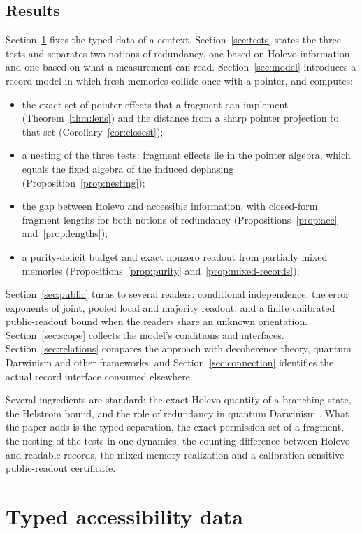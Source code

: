 \documentclass[12pt,a4paper]{article}
\begin{document}
\subsection{Results}

Section~\ref{sec:background} fixes the typed data of a context. Section~\ref{sec:tests} states the three tests and separates two notions of redundancy, one based on Holevo information and one based on what a measurement can read. Section~\ref{sec:model} introduces a record model in which fresh memories collide once with a pointer, and computes:
\begin{itemize}
\item the exact set of pointer effects that a fragment can implement (Theorem~\ref{thm:lens}) and the distance from a sharp pointer projection to that set (Corollary~\ref{cor:closest});
\item a nesting of the three tests: fragment effects lie in the pointer algebra, which equals the fixed algebra of the induced dephasing (Proposition~\ref{prop:nesting});
\item the gap between Holevo and accessible information, with closed-form fragment lengths for both notions of redundancy (Propositions~\ref{prop:acc} and~\ref{prop:lengths});
\item a purity-deficit budget and exact nonzero readout from partially mixed memories (Propositions~\ref{prop:purity} and~\ref{prop:mixed-records});
\end{itemize}
Section~\ref{sec:public} turns to several readers: conditional independence, the error exponents of joint, pooled local and majority readout, and a finite calibrated public-readout bound when the readers share an unknown orientation. Section~\ref{sec:scope} collects the model's conditions and interfaces. Section~\ref{sec:relations} compares the approach with decoherence theory, quantum Darwinism and other frameworks, and Section~\ref{sec:connection} identifies the actual record interface consumed elsewhere.

Several ingredients are standard: the exact Holevo quantity of a branching state, the Helstrom bound, and the role of redundancy in quantum Darwinism \cite{Zurek2003,Zurek2009,ZwolakRiedelZurek2016}. What the paper adds is the typed separation, the exact permission set of a fragment, the nesting of the tests in one dynamics, the counting difference between Holevo and readable records, the mixed-memory realization and a calibration-sensitive public-readout certificate.

\section{Typed accessibility data}
\label{sec:background}
\end{document}
